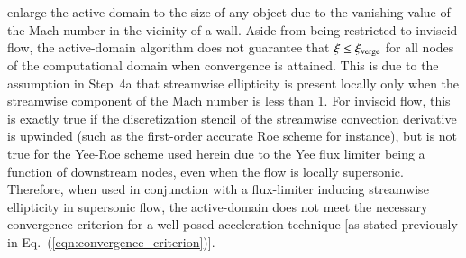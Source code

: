 \documentclass{warpdoc}
\newcommand{\xiverge}{{\xi_{\rm verge}}}
\begin{document}
enlarge the active-domain to the size of any object due to the vanishing
value of the Mach number in the vicinity of a wall.
Aside from being restricted to inviscid flow,
the active-domain algorithm does not guarantee
that $\xi \leq \xiverge$ for all nodes of the computational domain when convergence
is attained. This is due to the assumption in Step~4a that
streamwise ellipticity is present locally only when the streamwise component of
the Mach number is less than 1. For inviscid flow, this is exactly true if
the discretization stencil of the streamwise
convection derivative is upwinded (such as the first-order accurate Roe scheme for
instance),  but is not true for the Yee-Roe scheme used herein due to the Yee
flux limiter being a function of downstream nodes, even when the flow is locally
supersonic.
Therefore, when used in conjunction with a flux-limiter inducing streamwise
ellipticity in supersonic flow, the active-domain
does not meet the necessary convergence criterion for a
well-posed acceleration technique [as stated previously in
Eq.~(\ref{eqn:convergence_criterion})].
\end{document}
